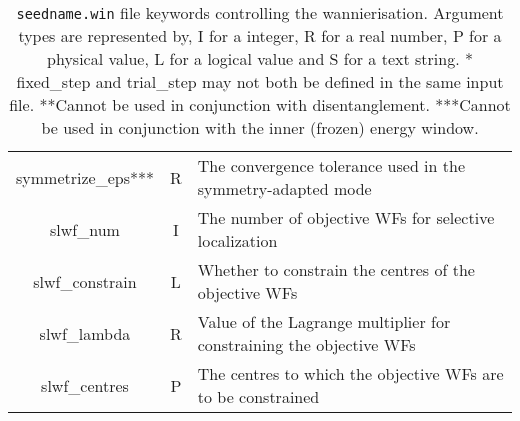 \begin{table}
\begin{center}
\begin{tabular}{|c|c|p{6cm}|}
{\sc  symmetrize\_eps}***   & R &  The convergence tolerance used in the symmetry-adapted mode \\
{\sc slwf\_num} & I & The number of objective WFs for selective localization \\
{\sc slwf\_constrain} & L & Whether to constrain the centres of the objective WFs \\
{\sc slwf\_lambda} & R & Value of the Lagrange multiplier for constraining the objective WFs \\
{\sc slwf\_centres} & P & The centres to which the objective WFs are to be constrained \\
\hline
\end{tabular}
\caption[Parameter file keywords controlling the Wannierise routine.]
{{\tt seedname.win} file keywords controlling the wannierisation.
  Argument types
are represented by, I for a integer, R for a real number, P for a
physical value, L for a logical value and S for a text string.
{\footnotesize
* {\sc fixed\_step } and  {\sc trial\_step } may not both be defined in
the same input file. **Cannot be used in conjunction with disentanglement.
***Cannot be used in conjunction with the inner (frozen) energy window.}}
\label{parameter_keywords5}
\end{center}
\end{table}



